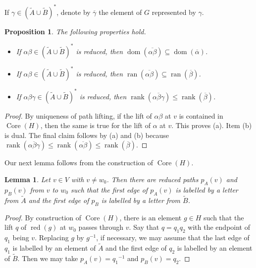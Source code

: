 \documentclass[11pt,reqno]{amsart}
\newtheorem{Prop}[Thm]{Proposition}
\newtheorem{Lemma}[Thm]{Lemma}
\begin{document}
If $\gamma\in ({\ensuremath{\widetilde {A}}}\cup {\ensuremath{\widetilde {B}}})^*$, denote by ${\ensuremath{\overline {{\gamma}}}}$ the element of $G$ represented by $\gamma$.

\begin{Prop}\label{factorrank}
The following properties hold.
\begin{itemize}
\item [(a)] If $\alpha\beta\in ({\ensuremath{\widetilde {A}}}\cup {\ensuremath{\widetilde {B}}})^*$ is reduced, then ${\mathop{\mathrm {dom}}\nolimits}({\ensuremath{\overline {{\alpha\beta}}}})\subseteq {\mathop{\mathrm {dom}}\nolimits}({\ensuremath{\overline {{\alpha}}}})$.
\item [(b)] If $\alpha\beta\in ({\ensuremath{\widetilde {A}}}\cup {\ensuremath{\widetilde {B}}})^*$ is reduced, then ${\mathop{\mathrm {ran}}\nolimits}({\ensuremath{\overline {{\alpha\beta}}}})\subseteq {\mathop{\mathrm {ran}}\nolimits}({\ensuremath{\overline {{\beta}}}})$.
\item [(c)] If $\alpha\beta\gamma\in ({\ensuremath{\widetilde {A}}}\cup {\ensuremath{\widetilde {B}}})^*$ is reduced,  then ${\mathop{\mathrm{rank}}}({\ensuremath{\overline {{\alpha\beta\gamma}}}})\leq {\mathop{\mathrm{rank}}} ({\ensuremath{\overline {\beta}}})$.
\end{itemize}
\end{Prop}
\begin{proof}
By uniqueness of path lifting, if the lift of $\alpha\beta$ at $v$ is contained in ${\mathop{\mathrm{Core}}\nolimits}(H)$, then the same is true for the lift of $\alpha$ at $v$. This proves (a).  Item (b) is dual.  The final claim follows by (a) and (b) because ${\mathop{\mathrm{rank}}}({\ensuremath{\overline {{\alpha\beta\gamma}}}})\leq {\mathop{\mathrm{rank}}}({\ensuremath{\overline {{\alpha\beta}}}})\leq {\mathop{\mathrm{rank}}}({\ensuremath{\overline {\beta}}})$.
\end{proof}

Our next lemma follows from the construction of ${\mathop{\mathrm{Core}}\nolimits}(H)$.

\begin{Lemma}\label{degree2}
Let $v\in V$ with $v\neq w_0$.  Then there are reduced paths $p_A(v)$ and $p_B(v)$ from $v$ to $w_0$ such that the first edge of $p_A(v)$ is labelled by a letter from ${\ensuremath{\widetilde {A}}}$ and the first edge of $p_B$ is labelled by a letter from ${\ensuremath{\widetilde {B}}}$.
\end{Lemma}
\begin{proof}
By construction of ${\mathop{\mathrm{Core}}\nolimits}(H)$, there is an element $g\in H$ such that the lift $q$ of ${\mathop{\mathrm{red}}\nolimits}(g)$ at $w_0$ passes through $v$.  Say that $q=q_1q_2$ with the endpoint of $q_1$ being $v$.  Replacing $g$ by $g{^{-1}}$, if necessary, we may assume that the last edge of $q_1$ is labelled by an element of ${\ensuremath{\widetilde {A}}}$ and the first edge of $q_2$ is labelled by an element of ${\ensuremath{\widetilde {B}}}$.  Then we may take $p_A(v)=q_1{^{-1}}$ and $p_B(v)=q_2$.
\end{proof}
\end{document}
